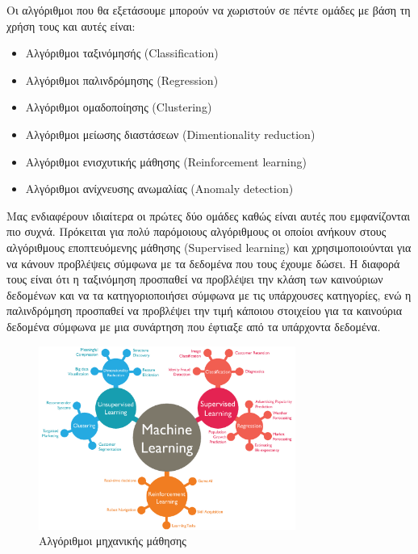 Οι αλγόριθμοι που θα εξετάσουμε μπορούν να χωριστούν σε πέντε
ομάδες με βάση τη χρήση τους και αυτές είναι:
\begin{itemize}
    \item Αλγόριθμοι ταξινόμησής (\textlatin{Classification})
    \item Αλγόριθμοι παλινδρόμησης (\textlatin{Regression})
    \item Αλγόριθμοι ομαδοποίησης (\textlatin{Clustering})
    \item Αλγόριθμοι μείωσης διαστάσεων (\textlatin{Dimentionality reduction})
    \item Αλγόριθμοι ενισχυτικής μάθησης (\textlatin{Reinforcement learning})
    \item Αλγόριθμοι ανίχνευσης ανωμαλίας (\textlatin{Anomaly detection})
\end{itemize}
Μας ενδιαφέρουν ιδιαίτερα οι πρώτες δύο ομάδες
καθώς είναι αυτές που
εμφανίζονται πιο συχνά. Πρόκειται για πολύ παρόμοιους
αλγόριθμους οι οποίοι ανήκουν στους αλγόριθμους εποπτευόμενης
μάθησης (\textlatin{Supervised learning}) και χρησιμοποιούνται
για να κάνουν προβλέψεις σύμφωνα με τα δεδομένα
που τους έχουμε
δώσει. Η διαφορά τους είναι ότι η ταξινόμηση προσπαθεί να
προβλέψει την κλάση των καινούριων δεδομένων και να τα
κατηγοριοποιήσει σύμφωνα με τις υπάρχουσες κατηγορίες, ενώ η
παλινδρόμηση προσπαθεί να προβλέψει την τιμή κάποιου στοιχείου
για τα καινούρια δεδομένα σύμφωνα με μια συνάρτηση που
έφτιαξε
από τα υπάρχοντα δεδομένα.
\begin{figure}[H]
    \centering
    \includegraphics[width=0.75\textwidth]{images/machineLearning.png}
    \caption{Αλγόριθμοι μηχανικής μάθησης}
\end{figure}